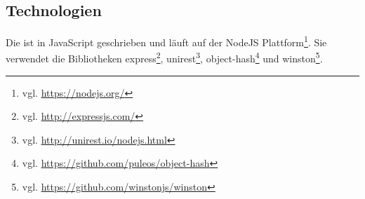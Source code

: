 \subsection{Technologien}
    Die {\classificationStorageAPI} ist in JavaScript geschrieben und läuft auf der
    NodeJS Plattform\footnote{vgl. \url{https://nodejs.org/}}.
    Sie verwendet die Bibliotheken
    express\footnote{vgl. \url{http://expressjs.com/}},
    unirest\footnote{vgl. \url{http://unirest.io/nodejs.html}},
    object-hash\footnote{vgl. \url{https://github.com/puleos/object-hash}}
    und winston\footnote{vgl. \url{https://github.com/winstonjs/winston}}.